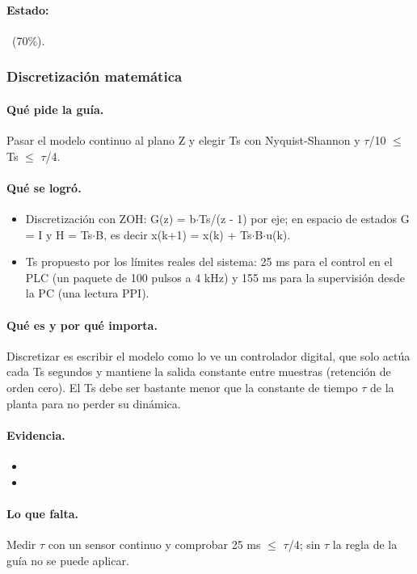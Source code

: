 \documentclass[a4paper,11pt]{article}
\begin{document}
\paragraph{Estado:} \parcial~(70\%).
\subsubsection{Discretización matemática}
\paragraph{Qué pide la guía.} Pasar el modelo continuo al plano Z y elegir Ts con Nyquist-Shannon y $\tau$/10 $\le$ Ts $\le$ $\tau$/4.
\paragraph{Qué se logró.}
\begin{itemize}
\item Discretización con ZOH: G(z) = b$\cdot$Ts/(z - 1) por eje; en espacio de estados G = I y H = Ts$\cdot$B, es decir x(k+1) = x(k) + Ts$\cdot$B$\cdot$u(k).
\item Ts propuesto por los límites reales del sistema: 25 ms para el control en el PLC (un paquete de 100 pulsos a 4 kHz) y 155 ms para la supervisión desde la PC (una lectura PPI).
\end{itemize}
\paragraph{Qué es y por qué importa.} Discretizar es escribir el modelo como lo ve un controlador digital, que solo actúa cada Ts segundos y mantiene la salida constante entre muestras (retención de orden cero). El Ts debe ser bastante menor que la constante de tiempo $\tau$ de la planta para no perder su dinámica.
\paragraph{Evidencia.}
\begin{itemize}\small
\item {}
\item {}
\end{itemize}
\paragraph{Lo que falta.} Medir $\tau$ con un sensor continuo y comprobar 25 ms $\le$ $\tau$/4; sin $\tau$ la regla de la guía no se puede aplicar.
\end{document}
